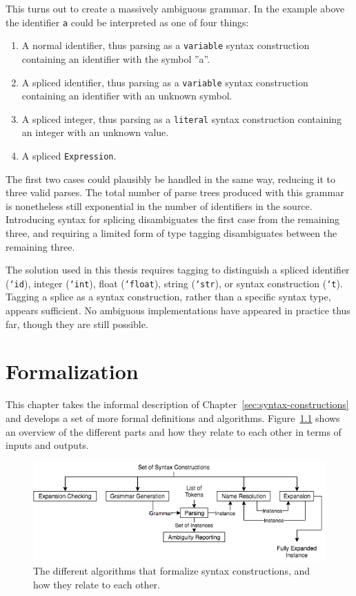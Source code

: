 \documentclass{kththesis}
\begin{document}
This turns out to create a massively ambiguous grammar. In the example above the identifier \texttt{a} could be interpreted as one of four things:
\begin{enumerate}
  \item A normal identifier, thus parsing as a \texttt{variable} syntax construction containing an identifier with the symbol ''a''.
  \item A spliced identifier, thus parsing as a \texttt{variable} syntax construction containing an identifier with an unknown symbol.
  \item A spliced integer, thus parsing as a \texttt{literal} syntax construction containing an integer with an unknown value.
  \item A spliced \texttt{Expression}.
\end{enumerate}

The first two cases could plausibly be handled in the same way, reducing it to three valid parses. The total number of parse trees produced with this grammar is nonetheless still exponential in the number of identifiers in the source. Introducing syntax for splicing disambiguates the first case from the remaining three, and requiring a limited form of type tagging disambiguates between the remaining three.

The solution used in this thesis requires tagging to distinguish a spliced identifier (\texttt{`id}), integer (\texttt{`int}), float (\texttt{`float}), string (\texttt{`str}), or syntax construction (\texttt{`t}). Tagging a splice as a syntax construction, rather than a specific syntax type, appears sufficient. No ambiguous implementations have appeared in practice thus far, though they are still possible.

\chapter{Formalization} \label{sec:formalization}

This chapter takes the informal description of Chapter~\ref{sec:syntax-constructions} and develops a set of more formal definitions and algorithms. Figure~\ref{fig:formalization-flowchart} shows an overview of the different parts and how they relate to each other in terms of inputs and outputs.

\begin{figure}[t]
\includegraphics[width=\textwidth]{resources/formalization-flowchart}
\caption{The different algorithms that formalize syntax constructions, and how they relate to each other.}
\label{fig:formalization-flowchart}
\end{figure}
\end{document}
